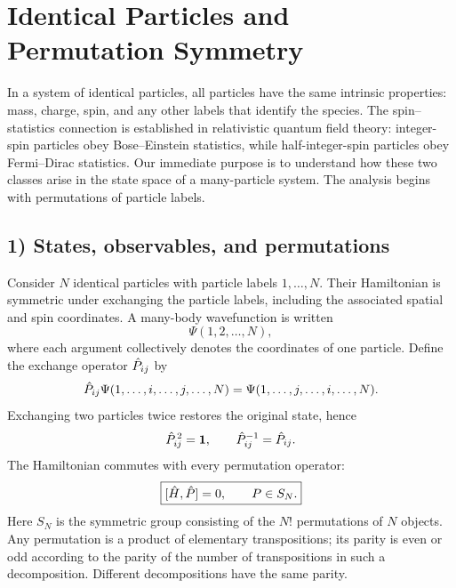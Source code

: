 \section{Identical Particles and Permutation Symmetry}

In a system of identical particles, all particles have the same intrinsic properties: mass, charge, spin, and any other labels that identify the species. The spin--statistics connection is established in relativistic quantum field theory: integer-spin particles obey Bose--Einstein statistics, while half-integer-spin particles obey Fermi--Dirac statistics. Our immediate purpose is to understand how these two classes arise in the state space of a many-particle system. The analysis begins with permutations of particle labels.

\subsection*{1) States, observables, and permutations}

Consider $N$ identical particles with particle labels $1,\ldots,N$. Their Hamiltonian is symmetric under exchanging the particle labels, including the associated spatial and spin coordinates. A many-body wavefunction is written
\begin{equation}
\Psi(1,2,\ldots,N),
\end{equation}
where each argument collectively denotes the coordinates of one particle. Define the exchange operator $\hat{P}_{ij}$ by
\begin{equation}
\hat{P}_{ij}\Psi(1,\ldots,i,\ldots,j,\ldots,N)
   =\Psi(1,\ldots,j,\ldots,i,\ldots,N).
\end{equation}
Exchanging two particles twice restores the original state, hence
\begin{equation}
\hat{P}_{ij}^{\,2}=\mathbf1,\qquad \hat{P}_{ij}^{-1}=\hat{P}_{ij}.
\end{equation}
The Hamiltonian commutes with every permutation operator:
\begin{equation}
\boxed{[\hat{H},\hat{P}]=0,\qquad P\in S_N.}
\end{equation}
Here $S_N$ is the symmetric group consisting of the $N!$ permutations of $N$ objects. Any permutation is a product of elementary transpositions; its parity is even or odd according to the parity of the number of transpositions in such a decomposition. Different decompositions have the same parity.

